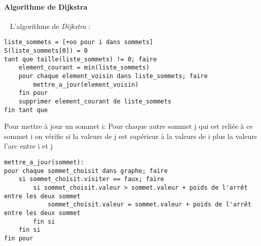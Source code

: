 		\paragraph{Algorithme de Dijkstra} ~
			L'algorithme de \emph{Dijkstra} :
			\begin{lstlisting}
liste_sommets = [+oo pour i dans sommets]
S(liste_sommets[0]) = 0
tant que taille(liste_sommets) != 0; faire
    element_courant = min(liste_sommets)
    pour chaque element_voisin dans liste_sommets; faire
        mettre_a_jour(element_voisin)
    fin pour
    supprimer element_courant de liste_sommets
fin tant que
			\end{lstlisting}
			Pour mettre à jour un sommet i:
				Pour chaque autre sommet j qui est reliée à ce sommet i on vérifie si
				la valeurs de j est supérieur à la valeurs de i plus la valeurs l'arc entre i et j
				
			\begin{lstlisting}
mettre_a_jour(sommet):
pour chaque sommet_choisit dans graphe; faire
	si sommet_choisit.visiter == faux; faire
		si sommet_choisit.valeur > sommet.valeur + poids de l'arrêt entre les deux sommet
			sommet_choisit.valeur = sommet.valeur + poids de l'arrêt entre les deux sommet
		fin si
	fin si
fin pour
			\end{lstlisting}

